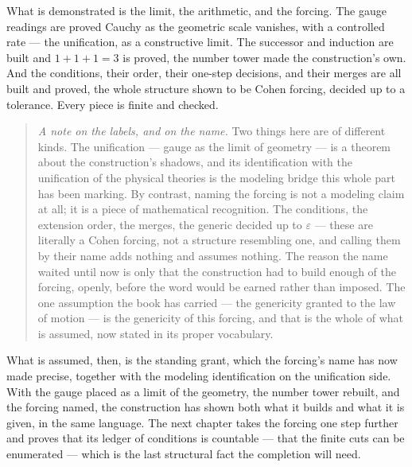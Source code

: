 What is demonstrated is the limit, the arithmetic, and the forcing. The gauge readings are proved Cauchy
as the geometric scale vanishes, with a controlled rate --- the unification, as a constructive limit.
The successor and induction are built and $1+1+1=3$ is proved, the number tower made the construction's
own. And the conditions, their order, their one-step decisions, and their merges are all built and
proved, the whole structure shown to be Cohen forcing, decided up to a tolerance. Every piece is finite
and checked.

\begin{quote}
\emph{A note on the labels, and on the name.} Two things here are of different kinds. The unification ---
gauge as the limit of geometry --- is a theorem about the construction's shadows, and its identification
with the unification of the physical theories is the modeling bridge this whole part has been marking. By
contrast, naming the forcing is not a modeling claim at all; it is a piece of mathematical recognition.
The conditions, the extension order, the merges, the generic decided up to $\varepsilon$ --- these are
literally a Cohen forcing, not a structure resembling one, and calling them by their name adds nothing
and assumes nothing. The reason the name waited until now is only that the construction had to build
enough of the forcing, openly, before the word would be earned rather than imposed. The one assumption
the book has carried --- the genericity granted to the law of motion --- is the genericity of this
forcing, and that is the whole of what is assumed, now stated in its proper vocabulary.
\end{quote}

What is assumed, then, is the standing grant, which the forcing's name has now made precise, together
with the modeling identification on the unification side. With the gauge placed as a limit of the
geometry, the number tower rebuilt, and the forcing named, the construction has shown both what it builds
and what it is given, in the same language. The next chapter takes the forcing one step further and
proves that its ledger of conditions is countable --- that the finite cuts can be enumerated --- which is
the last structural fact the completion will need.
